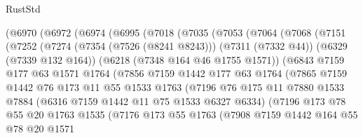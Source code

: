 \begin{lexlean}{RustStd}
\begin{coremodule}
{\begin{coremodule}
{{{{{{{{{{{{{{{{{{{{{{{{{{{{{{{{{{{      (@6970
        (@6972
          (@6974
            (@6995
              (@7018
                (@7035
                  (@7053
                    (@7064
                      (@7068
                        (@7151
                          (@7252
                            (@7274
                              (@7354 (@7526 (@8241 @8243)))
                              (@7311 (@7332 @44))
                              (@6329 (@7339 @132 @164))
                              (@6218 (@7348 @164 @46 @1755 @1571))
                              (@6843
                                @7159
                                @177
                                @63
                                @1571
                                @1764
                                (@7856
                                  @7159
                                  @1442
                                  @177
                                  @63
                                  @1764
                                  (@7865
                                    @7159
                                    @1442
                                    @76
                                    @173
                                    @11
                                    @55
                                    @1533
                                    @1763
                                    (@7196
                                      @76
                                      @175
                                      @11
                                      @7880
                                      @1533
                                      @7884
                                      (@6316 @7159 @1442 @11 @75 @1533 @6327 @6334)
                                      (@7196
                                        @173
                                        @78
                                        @55
                                        @20
                                        @1763
                                        @1535
                                        (@7176
                                          @173
                                          @55
                                          @1763
                                          (@7908
                                            @7159
                                            @1442
                                            @164
                                            @55
                                            @78
                                            @20
                                            @1571
}}}}}}}}}}}}}}}}}}}}}}}}}}}}}}}}}}}
\end{coremodule}}
\end{coremodule}
\end{lexlean}
